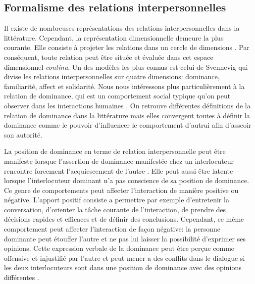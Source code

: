 \documentclass [french]{sig-alternate-05-2015}
\begin{document}
\subsection{Formalisme des relations interpersonnelles}
\label{RI}
Il existe de nombreuses représentations des relations interpersonnelles dans la littérature. Cependant, la représentation dimensionnelle demeure la plus courante. Elle consiste à projeter les relations dans un cercle de dimensions \cite{wiggins1985interpersonal}. Par conséquent, toute relation peut être située et évaluée dans cet espace dimensionnel \textit{continu}. Un des modèles les plus connus est celui de Svennevig \cite{svennevig2000getting} qui divise les relations interpersonnelles sur quatre dimensions: dominance, familiarité, affect et solidarité. Nous nous intéressons plus particulièrement à la relation de dominance, qui est un comportement social typique qu'on peut observer dans les interactions humaines \cite{dunbar2005perceptions}. On retrouve différentes définitions de la relation de dominance dans la littérature mais elles convergent toutes à définir la dominance comme le pouvoir d'influencer le comportement d'autrui afin d'asseoir son autorité\cite{dunbar2005perceptions,rogers1979domineeringness,moon1998intimate}.

La position de dominance en terme de relation interpersonnelle peut être manifeste \cite{dunbar2005perceptions} lorsque l'assertion de dominance manifestée chez un interlocuteur rencontre forcement  l'acquiescement de l'autre \cite{rogers1979domineeringness}. Elle peut aussi être latente \cite{komter1989hidden} lorsque l'interlocuteur dominant n'a pas conscience de sa position de dominance. Ce genre de comportements peut affecter l'interaction de manière positive ou négative. L'apport positif consiste a permettre par exemple d'entretenir la conversation, d'orienter la tâche courante de l'interaction, de prendre des décisions rapides et efficaces et de définir des conclusions. Cependant, ce même comportement peut affecter l'interaction de façon négative: la personne dominante peut étouffer l'autre et ne pas lui laisser la possibilité d'exprimer ses opinions. Cette expression verbale de la dominance peut être perçue comme offensive et injustifié par l'autre et peut mener a des conflits dans le dialogue si les deux interlocuteurs sont dans une position de dominance avec des opinions différentes \cite{zablotskaya2012relating}.
\end{document}
